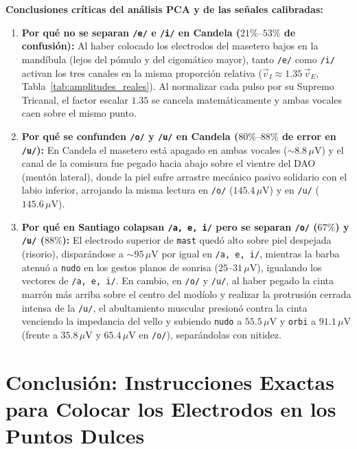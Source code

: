 \documentclass[11pt, a4paper]{article}
\begin{document}
\noindent \textbf{Conclusiones críticas del análisis PCA y de las señales calibradas:}
\begin{enumerate}\setlength{\itemsep}{2pt}
    \item \textbf{Por qué no se separan \texttt{/e/} e \texttt{/i/} en Candela ($21\%\text{--}53\%$ de confusión):} Al haber colocado los electrodos del masetero bajos en la mandíbula (lejos del pómulo y del cigomático mayor), tanto \texttt{/e/} como \texttt{/i/} activan los tres canales en la misma proporción relativa ($\vec{v}_I \approx 1.35\,\vec{v}_E$, Tabla~\ref{tab:amplitudes_reales}). Al normalizar cada pulso por su Supremo Tricanal, el factor escalar $1.35$ se cancela matemáticamente y ambas vocales caen sobre el mismo punto.
    \item \textbf{Por qué se confunden \texttt{/o/} y \texttt{/u/} en Candela ($80\%\text{--}88\%$ de error en \texttt{/u/}):} En Candela el masetero está apagado en ambas vocales ($\sim 8.8\,\mu\text{V}$) y el canal de la comisura fue pegado hacia abajo sobre el vientre del DAO (mentón lateral), donde la piel sufre arrastre mecánico pasivo solidario con el labio inferior, arrojando la misma lectura en \texttt{/o/} ($145.4\,\mu\text{V}$) y en \texttt{/u/} ($145.6\,\mu\text{V}$).
    \item \textbf{Por qué en Santiago colapsan \texttt{/a, e, i/} pero se separan \texttt{/o/} ($67\%$) y \texttt{/u/} ($88\%$):} El electrodo superior de \texttt{mast} quedó alto sobre piel despejada (risorio), disparándose a $\sim 95\,\mu\text{V}$ por igual en \texttt{/a, e, i/}, mientras la barba atenuó a \texttt{nudo} en los gestos planos de sonrisa ($25\text{--}31\,\mu\text{V}$), igualando los vectores de \texttt{/a, e, i/}. En cambio, en \texttt{/o/} y \texttt{/u/}, al haber pegado la cinta marrón más arriba sobre el centro del modíolo y realizar la protrusión cerrada intensa de la \texttt{/u/}, el abultamiento muscular presionó contra la cinta venciendo la impedancia del vello y subiendo \texttt{nudo} a $55.5\,\mu\text{V}$ y \texttt{orbi} a $91.1\,\mu\text{V}$ (frente a $35.8\,\mu\text{V}$ y $65.4\,\mu\text{V}$ en \texttt{/o/}), separándolas con nitidez.
\end{enumerate}

\section{Conclusión: Instrucciones Exactas para Colocar los Electrodos en los Puntos Dulces}
\end{document}
